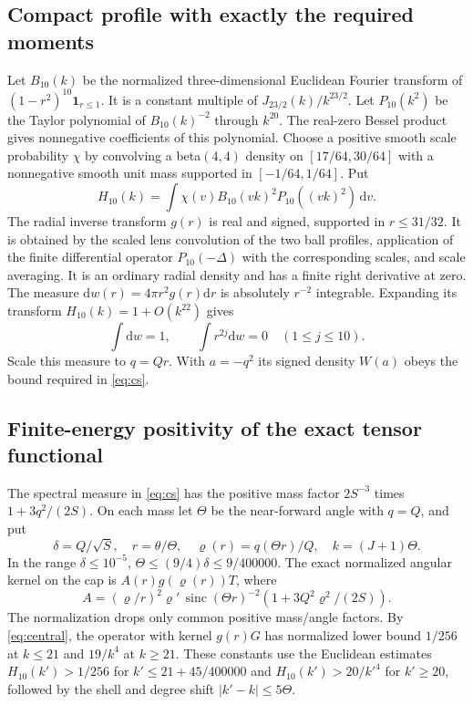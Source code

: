 \documentclass[11pt,a4paper]{article}
\theoremstyle{definition}
\theoremstyle{remark}
\newcommand{\dS}{\mathrm{d}}
\newcommand{\sinc}{\operatorname{sinc}}
\begin{document}
\subsection{Compact profile with exactly the required moments}
Let $B_{10}(k)$ be the normalized three-dimensional Euclidean Fourier transform of $(1-r^2)^{10}\mathbf1_{r\le1}$. It is a constant multiple of $J_{23/2}(k)/k^{23/2}$. Let $P_{10}(k^2)$ be the Taylor polynomial of $B_{10}(k)^{-2}$ through $k^{20}$. The real-zero Bessel product gives nonnegative coefficients of this polynomial. Choose a positive smooth scale probability $\chi$ by convolving a beta$(4,4)$ density on $[17/64,30/64]$ with a nonnegative smooth unit mass supported in $[-1/64,1/64]$. Put
\begin{equation}\label{eq:H}
 H_{10}(k)=\int \chi(v) B_{10}(vk)^2P_{10}((vk)^2)\,\dS v.
\end{equation}
The radial inverse transform $g(r)$ is real and signed, supported in $r\le31/32$. It is obtained by the scaled lens convolution of the two ball profiles, application of the finite differential operator $P_{10}(-\Delta)$ with the corresponding scales, and scale averaging. It is an ordinary radial density and has a finite right derivative at zero. The measure $\dS w(r)=4\pi r^2g(r)\dS r$ is absolutely $r^{-2}$ integrable. Expanding its transform $H_{10}(k)=1+O(k^{22})$ gives
\begin{equation}\label{eq:nulls}
       \int\dS w=1,\qquad \int r^{2j}\dS w=0
                      \quad(1\le j\le10).
\end{equation}
Scale this measure to $q=Qr$. With $a=-q^2$ its signed density $W(a)$ obeys the bound required in \eqref{eq:cs}.

\subsection{Finite-energy positivity of the exact tensor functional}
The spectral measure in \eqref{eq:cs} has the positive mass factor $2S^{-3}$ times $1+3q^2/(2S)$. On each mass let $\Theta$ be the near-forward angle with $q=Q$, and put
\[
 \delta=Q/\sqrt S,\quad r=\theta/\Theta,\quad
 \varrho(r)=q(\Theta r)/Q,\quad k=(J+1)\Theta .
\]
In the range $\delta\le10^{-5}$, $\Theta\le(9/4)\delta\le9/400000$. The exact normalized angular kernel on the cap is $A(r)g(\varrho(r))T$, where
\begin{equation}\label{eq:aratio}
 A=(\varrho/r)^2\varrho'\,\sinc(\Theta r)^{-2}
                  (1+3Q^2\varrho^2/(2S)).
\end{equation}
The normalization drops only common positive mass/angle factors. By \eqref{eq:central}, the operator with kernel $g(r)G$ has normalized lower bound $1/256$ at $k\le21$ and $19/k^4$ at $k\ge21$. These constants use the Euclidean estimates
$H_{10}(k')>1/256$ for $k'\le 21+45/400000$ and
$H_{10}(k')>20/k'^4$ for $k'\ge20$, followed by the shell and degree shift $|k'-k|\le5\Theta$.
\end{document}
